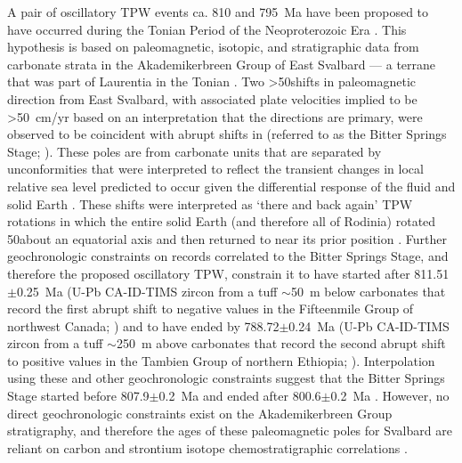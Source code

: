 A pair of oscillatory TPW events ca. 810 and 795~Ma have been proposed to have occurred during the Tonian Period of the Neoproterozoic Era \citep{Maloof2006a}. This hypothesis is based on paleomagnetic, isotopic, and stratigraphic data from carbonate strata in the Akademikerbreen Group of East Svalbard --- a terrane that was part of Laurentia in the Tonian \citep{Maloof2006a}. Two \textgreater50\degrees shifts in paleomagnetic direction from East Svalbard, with associated plate velocities implied to be \textgreater50~cm/yr based on an interpretation that the directions are primary, were observed to be coincident with abrupt shifts in \dC (referred to as the Bitter Springs Stage; \citealp{Maloof2006a}). These poles are from carbonate units that are separated by unconformities that were interpreted to reflect the transient changes in local relative sea level predicted to occur given the differential response of the fluid and solid Earth \citep{Mound1999a, Maloof2006a}. These shifts were interpreted as `there and back again' TPW rotations in which the entire solid Earth (and therefore all of Rodinia) rotated 50\degrees about an equatorial axis and then returned to near its prior position \citep{Maloof2006a}. Further geochronologic constraints on \dC records correlated to the Bitter Springs Stage, and therefore the proposed oscillatory TPW, constrain it to have started after 811.51$\pm$0.25~Ma (U-Pb CA-ID-TIMS zircon from a tuff $\sim$50~m below carbonates that record the first abrupt shift to negative \dC values in the Fifteenmile Group of northwest Canada; \citealp{Macdonald2010a}) and to have ended by 788.72$\pm$0.24~Ma (U-Pb CA-ID-TIMS zircon from a tuff $\sim$250~m above carbonates that record the second abrupt shift to positive \dC values in the Tambien Group of northern Ethiopia; \citealp{Swanson-Hysell2015a, Park2020a}). Interpolation using these and other geochronologic constraints suggest that the Bitter Springs Stage started before 807.9$\pm$0.2~Ma and ended after 800.6$\pm$0.2~Ma \citep{Swanson-Hysell2015a}. However, no direct geochronologic constraints exist on the Akademikerbreen Group stratigraphy, and therefore the ages of these paleomagnetic poles for Svalbard are reliant on carbon and strontium isotope chemostratigraphic correlations \citep{Halverson2007a}.

